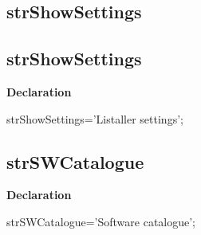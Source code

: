 \documentclass{report}
\newif\ifpdf
\begin{document}
\subsection*{\large{\textbf{strShowSettings}}\normalsize\hspace{1ex}\hrulefill}
\else
\subsection*{strShowSettings}
\fi
\label{trstrings-strShowSettings}
\begin{list}{}{
\setlength{\itemindent}{0cm}
\setlength{\listparindent}{0cm}
\setlength{\leftmargin}{\evensidemargin}
\addtolength{\leftmargin}{\tmplength}
\settowidth{\labelsep}{X}
\addtolength{\leftmargin}{\labelsep}
\setlength{\labelwidth}{\tmplength}
}
\item[\textbf{Declaration}\hfill]
\ifpdf
\begin{flushleft}
\fi
\begin{ttfamily}
strShowSettings='Listaller settings';\end{ttfamily}

\ifpdf
\end{flushleft}
\fi

\end{list}
\ifpdf
\subsection*{\large{\textbf{strSWCatalogue}}\normalsize\hspace{1ex}\hrulefill}
\else
\subsection*{strSWCatalogue}
\fi
\label{trstrings-strSWCatalogue}
\begin{list}{}{
\setlength{\itemindent}{0cm}
\setlength{\listparindent}{0cm}
\setlength{\leftmargin}{\evensidemargin}
\addtolength{\leftmargin}{\tmplength}
\settowidth{\labelsep}{X}
\addtolength{\leftmargin}{\labelsep}
\setlength{\labelwidth}{\tmplength}
}
\item[\textbf{Declaration}\hfill]
\ifpdf
\begin{flushleft}
\fi
\begin{ttfamily}
strSWCatalogue='Software catalogue';\end{ttfamily}

\ifpdf
\end{flushleft}
\fi

\end{list}
\ifpdf
\end{document}
